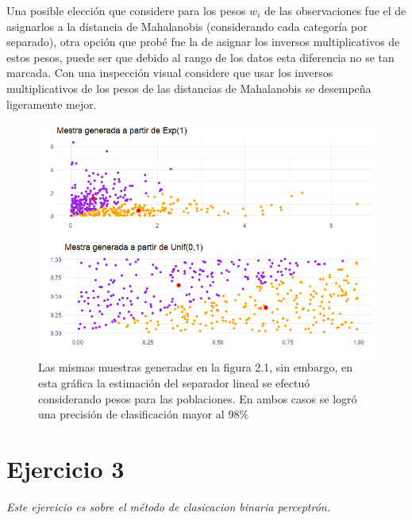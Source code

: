 \documentclass[paper=letter, fontsize=11pt]{scrartcl}
\numberwithin{equation}{section} %
\numberwithin{figure}{section} %
\numberwithin{table}{section} %
\begin{document}
Una posible elección que considere para los pesos $w_i$ de las observaciones fue el de asignarlos a la distancia de Mahalanobis (considerando cada categoría por separado), otra opción que probé fue la de asignar los inversos multiplicativos de estos pesos, puede ser que debido al rango de los datos esta diferencia no se tan marcada. Con una inspección visual considere que usar los inversos multiplicativos de los pesos de las distancias de Mahalanobis se desempeña ligeramente mejor.

\begin{figure}[H]
  \begin{center}
    \includegraphics[scale=.8]{figura2_2.png}
    \caption{ Las mismas muestras generadas en la figura 2.1, sin embargo, en esta  gráfica la estimación del separador lineal se efectuó considerando pesos para las poblaciones. En ambos casos se logró una precisión de clasificación mayor al 98\% }
    \label{figura2_2}
  \end{center}
\end{figure}
\FloatBarrier

\section{Ejercicio 3}
\textit{Este ejercicio es sobre el método de clasicacion binaria perceptrón.}
\end{document}

